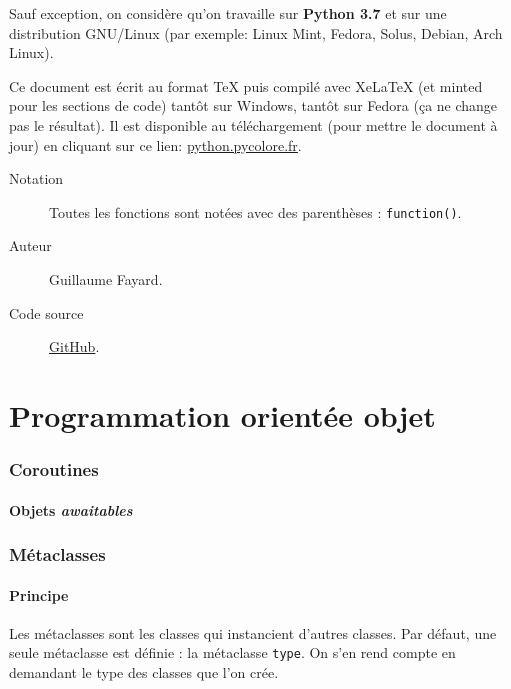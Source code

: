 \documentclass[a4paper, 10pt]{article}
\begin{document}
Sauf exception, on considère qu'on travaille sur \textbf{Python 3.7} et sur une distribution GNU/Linux (par exemple: Linux Mint, Fedora, Solus, Debian, Arch Linux).\bigskip

Ce document est écrit au format TeX puis compilé avec XeLaTeX (et minted pour les sections de code) tantôt sur Windows, tantôt sur Fedora (ça ne change pas le résultat). Il est disponible au téléchargement (pour mettre le document à jour) en cliquant sur ce lien: \href{https://python.pycolore.fr}{python.pycolore.fr}.\bigskip

\begin{description}
	\item[{\sffamily Notation}] Toutes les fonctions sont notées avec des parenthèses : \texttt{function()}.
	\item[{\sffamily Auteur}] Guillaume Fayard.
	\item[{\sffamily Code source}] \href{https://github.com/Arkelis/memo-python}{GitHub}.
\end{description}

\newpage
\part{Programmation orientée objet}









\section{Coroutines}
\subsection{Objets \emph{awaitables}}



\section{Métaclasses}
\subsection{Principe}
\label{sec:metaclasses}
Les métaclasses sont les classes qui instancient d'autres classes. Par défaut, une seule métaclasse est définie : la métaclasse \texttt{type}. On s'en rend compte en demandant le type des classes que l'on crée.
\end{document}

